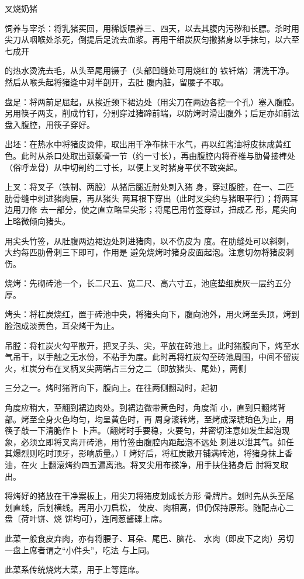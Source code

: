 \begin{recipe}{叉烧奶猪}

\ingredients


\cooking

\step 饲养与宰杀：将乳猪买回，用稀饭喂养三、四天，以去其腹内污秽和长膘。杀时用尖刀从咽喉处杀死，倒提后足流去血浆。再用干细炭灰匀撒猪身以手抹匀，以六至七成开

的热水烫洗去毛，从头至尾用镊子（头部凹缝处可用烧红的 铁钎烙）清洗干净。然后从喉头起将猪逢中对半剖开，去肚 腹内脏，留腰子不取。

\step 盘足：将两前足屈起，从挨近颈下裙边处（用尖刀在两边各挖一个孔）塞入腹腔。另用筷子两支，削成竹钉，分别穿过猪蹄前端，以防烤时滑出腹外；后足亦如前法盘入腹腔，用筷子穿好。

\step 出坯：在热水中将猪皮烫伸，取出用千净布抹干水气，再以红酱油将皮抹成黄红色。此时从杀口处取出颈颡骨一节（约一寸长），再由腹腔内将脊椎与肋骨接榫处（俗呼龙骨）从中切剖约二寸长，以便上叉时猪身平伏不致突起。

上叉：将叉子（铁制、两股）从猪后腿近肘处刺入猪 身，穿过腹腔，在一、二匹肋骨缝中刺进猪肉层，再从猪头 两耳根下穿出（此时叉尖约与猪眼平行〕；将两耳边用刀修 去一部分，使之直立略呈尖形；将尾巴用竹签穿过，扭成乙 形，尾尖向上略微倾向猪头。

用尖头竹签，从肚腹两边裙边处刺进猪肉，以不伤皮为 度。在肋缝处可以斜刺，大约每匹肋骨刺三下即可，作用是 避免烧烤时猪身皮面起泡。注意切勿将猪皮刺伤。

\step 烧烤：先砌砖池一个，长二尺五、宽二尺、高六寸五，池底垫细炭灰一层约五分厚。

\step 烤头：将杠炭烧红，置于砖池中央，将猪头向下，腹向池外，用火烤至头顶，烤到脸泡成淡黄色，耳朵烤干为止。

\step 吊膛：将杠炭火勾平散开，把叉子头、尖，平放在砖池上。此时猪腹向下，烤至水气吊干，以手触之无水份，不粘手为度。此时再将杠炭勾至砖池周围，中间不留炭火，杠炭分布在叉柄叉尖两端占三分之二（即放猪头、尾处），两侧

三分之一。烤时猪背向下，腹向上。在往两侧翻动时，起初

角度应稍大，至翻到裙边肉处。到裙边微带黄色时，角度渐 小，直到只翻烤背部。烤至全身火色均匀，均呈黄色时，再 周身滚转烤，至烤成深琥珀色为止，用筷子敲一下清脆作卜 卜声。（翻烤时手要稳，火要匀，并密切注意如发生起泡现 象，必须立即将叉离开砖池，用竹签由腹腔内距起泡不远处 刺进以泄其气。如任其爆烈则吃时顶牙，影响质量。）I 烤好后，将杠炭散开铺满砖池，将猪身抹上香油，在火 上翻滚烤约四五遍离池。将叉尖用布搽净，用手扶住猪身后 肘将叉取出。

将烤好的猪放在干净案板上，用尖刀将猪皮划成长方形 骨牌片。划时先从头至尾划直线，后划横线。再用小刀启松， 使皮、肉相离，但仍保持原形。随配点心二盘〔荷叶饼、烧 饼均可），连同葱酱碟上席。

此菜一般食皮弃肉，亦有将腰子、耳朵、尾巴、脑花、 水肉（即皮下之肉）另切一盘上席者谓之“小件头”，吃法 与上同。

\notes

此菜系传统烧烤大菜，用于上等筵席。

\end{recipe}

